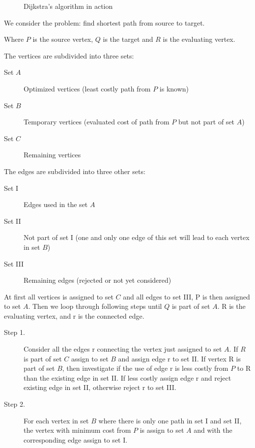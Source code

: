   \begin{figure}[ht!]
    \centering
    \caption{Dijkstra's algorithm in action}
    \label{fig:dijkstra}
  \end{figure}

  We consider the problem: find shortest path from source to target.

  Where $P$ is the source vertex, $Q$ is the target and $R$ is the evaluating vertex.

  The vertices are subdivided into three sets:

  \begin{description}
    \item[Set $A$]{Optimized vertices (least costly path from $P$ is known)}
    \item[Set $B$]{Temporary vertices (evaluated cost of path from $P$ but not part of set $A$)}
    \item[Set $C$]{Remaining vertices}
  \end{description}

  The edges are subdivided into three other sets:

  \begin{description}
    \item[Set \RN{1}]{Edges used in the set $A$}
    \item[Set \RN{2}]{Not part of set I (one and only one edge of this set will lead to each vertex in set $B$)}
    \item[Set \RN{3}]{Remaining edges (rejected or not yet considered)}
  \end{description}

  At first all vertices is assigned to set $C$ and all edges to set \RN{3}, P is then assigned to set $A$.
  Then we loop through following steps until $Q$ is part of set $A$. R is the evaluating vertex, and r is the connected edge.

  \begin{description}
    \item[Step 1.]{Consider all the edges r connecting the vertex just assigned to set $A$. If $R$ is part of set $C$ assign to set $B$ and assign edge r to set \RN{2}. If vertex R is part of set $B$, then investigate if the use of edge r is less costly from $P$ to R than the existing edge in set \RN{2}. If less costly assign edge r and reject existing edge in set \RN{2}, otherwise reject r to set \RN{3}.}
    \item[Step 2.]{For each vertex in set $B$ where there is only one path in set \RN{1} and set \RN{2}, the vertex with minimum cost from $P$ is assign to set $A$ and with the corresponding edge assign to set \RN{1}.}
  \end{description}

